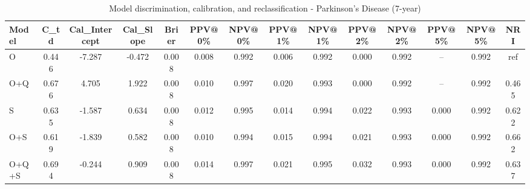 \begin{table}[htbp]
\centering
\small
\caption{Model discrimination, calibration, and reclassification - Parkinson's Disease (7-year)}
\label{tab:perf_pd_7y}
\begin{tabular}{lccccccccccccc}
\toprule
Model & C\_td & Cal\_Intercept & Cal\_Slope & Brier & PPV@0\% & NPV@0\% & PPV@1\% & NPV@1\% & PPV@2\% & NPV@2\% & PPV@5\% & NPV@5\% & NRI \\
\midrule
O & 0.446 & -7.287 & -0.472 & 0.008 & 0.008 & 0.992 & 0.006 & 0.992 & 0.000 & 0.992 & -- & 0.992 & ref \\
O+Q & 0.676 & 4.705 & 1.922 & 0.008 & 0.010 & 0.997 & 0.020 & 0.993 & 0.000 & 0.992 & -- & 0.992 & 0.465 \\
S & 0.635 & -1.587 & 0.634 & 0.008 & 0.012 & 0.995 & 0.014 & 0.994 & 0.022 & 0.993 & 0.000 & 0.992 & 0.622 \\
O+S & 0.619 & -1.839 & 0.582 & 0.008 & 0.010 & 0.994 & 0.015 & 0.994 & 0.021 & 0.993 & 0.000 & 0.992 & 0.662 \\
O+Q+S & 0.694 & -0.244 & 0.909 & 0.008 & 0.014 & 0.997 & 0.021 & 0.995 & 0.032 & 0.993 & 0.000 & 0.992 & 0.637 \\
\bottomrule
\end{tabular}
\end{table}